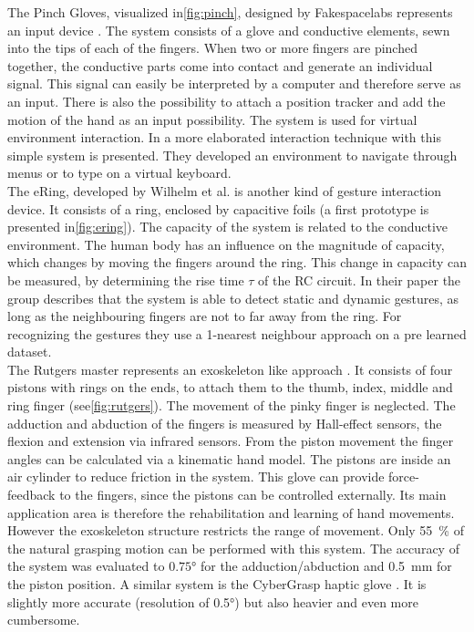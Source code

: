 The Pinch Gloves, visualized in\ref{fig:pinch}, designed by Fakespacelabs represents an input device \cite{bowman2001using}. The system consists of a glove and conductive elements, sewn into the tips of each of the fingers. When two or more fingers are pinched together, the conductive parts come into contact and generate an individual signal. This signal can easily be interpreted by a computer and therefore serve as an input. There is also the possibility to attach a position tracker and add the motion of the hand as an input possibility. The system is used for virtual environment interaction. In \cite{bowman2001using} a more elaborated interaction technique with this simple system is presented. They developed an environment to navigate through menus or to type on a virtual keyboard.\\
The eRing, developed by Wilhelm et al. is another kind of gesture interaction device. It consists of a ring, enclosed by capacitive foils (a first prototype is presented in\ref{fig:ering}). The capacity of the system is related to the conductive environment. The human body has an influence on the magnitude of capacity, which changes by moving the fingers around the ring. This change in capacity can be measured, by determining the rise time $ \tau $ of the RC circuit. In their paper the group describes that the system is able to detect static and dynamic gestures, as long as the neighbouring fingers are not to far away from the ring. For recognizing the gestures they use a 1-nearest neighbour approach on a pre learned dataset.\\
The Rutgers master  represents an exoskeleton like approach \cite{bouzit2002rutgers}. It consists of four pistons with rings on the ends, to attach them to the thumb, index, middle and ring finger (see\ref{fig:rutgers}). The movement of the pinky finger is neglected. The adduction and abduction of the fingers is measured by Hall-effect sensors, the flexion and extension via infrared sensors. From the piston movement the finger angles can be calculated via a kinematic hand model. The pistons are inside an air cylinder to reduce friction in the system. This glove can provide force-feedback to the fingers, since the pistons can be controlled externally. Its main application area is therefore the rehabilitation and learning of hand movements. However the exoskeleton structure restricts the range of movement. Only \SI{55}{\percent} of the natural grasping motion can be performed with this system. The accuracy of the system was evaluated to $ \ang{0.75} $ for the adduction/abduction and \SI{0.5}{mm} for the piston position. A similar system is the CyberGrasp haptic glove \cite{cyberglove}. It is slightly more accurate (resolution of \ang{0.5}) but also heavier and even more cumbersome.\\
